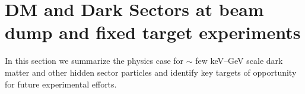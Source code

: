 \documentclass[../report.tex]{subfiles}
\begin{document}
\section{DM and Dark Sectors at beam dump and fixed target experiments}

In this section we  summarize the physics case for $\sim$ few keV--GeV scale dark matter and other hidden sector particles and identify key targets of opportunity for future experimental efforts. 
\end{document}
